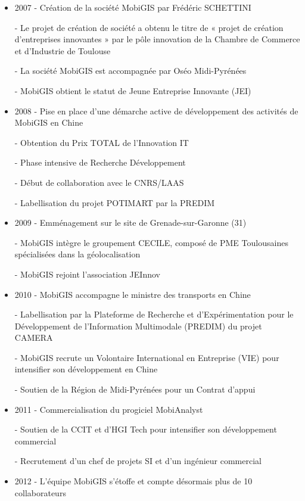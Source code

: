\renewcommand{\labelitemi}{\textbullet}
\begin{itemize}
\item 2007 
    - Création de la société MobiGIS par Frédéric SCHETTINI 
		
    - Le projet de création de société a obtenu le titre de « projet de création d’entreprises innovantes » par le pôle innovation de la Chambre de Commerce et d’Industrie de Toulouse 
		
    - La société MobiGIS est accompagnée par Oséo Midi-Pyrénées 
    
		- MobiGIS obtient le statut de Jeune Entreprise Innovante (JEI) 
\\
\item 2008 
    - Pise en place d’une démarche active de développement des activités de MobiGIS en Chine 
    
		- Obtention du Prix TOTAL de l’Innovation IT 
    
		- Phase intensive de Recherche Développement 
    
		- Début de collaboration avec le CNRS/LAAS 
    
		- Labellisation du projet POTIMART par la PREDIM 
\\
\item 2009 
    - Emménagement sur le site de Grenade-sur-Garonne (31) 
    
		- MobiGIS intègre le groupement CECILE, composé de PME Toulousaines spécialisées dans la géolocalisation 
    
		- MobiGIS rejoint l’association JEInnov 
\\
\item 2010 
    - MobiGIS accompagne le ministre des transports en Chine 
    
		- Labellisation par la Plateforme de Recherche et d’Expérimentation pour le Développement de l’Information Multimodale (PREDIM) du projet CAMERA 
    
		- MobiGIS recrute un Volontaire International en Entreprise (VIE) pour intensifier son développement en Chine 
    
		- Soutien de la Région de Midi-Pyrénées pour un Contrat d’appui 
\\
\item 2011 
    - Commercialisation du progiciel MobiAnalyst 
    
		- Soutien de la CCIT et d’HGI Tech pour intensifier son développement commercial 
    
		- Recrutement d’un chef de projets SI et d’un ingénieur commercial 
\\
\item 2012 
    - L’équipe MobiGIS s’étoffe et compte désormais plus de 10 collaborateurs 
    

\end{itemize}
